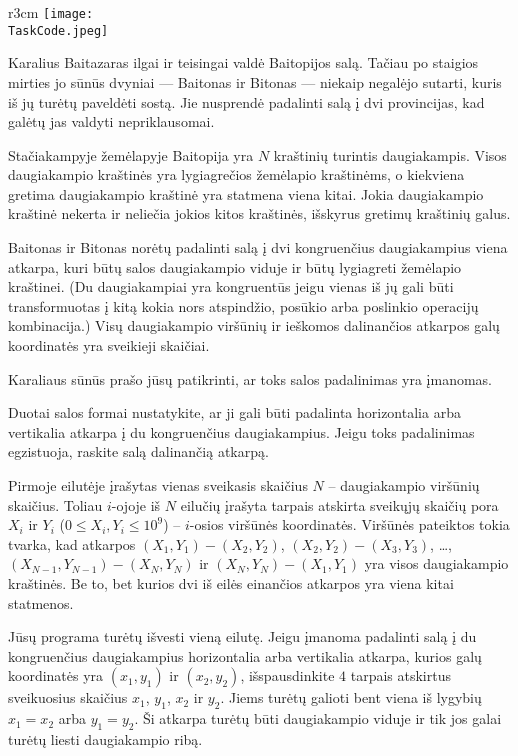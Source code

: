 \documentclass{boi2014-lt}
\renewcommand{\TaskCode}{demarcation}
\begin{document}
    \begin{wrapfigure}{r}{3cm}
        \vspace{-24pt}
		\texttt{[image: \\TaskCode.jpeg]}
	\end{wrapfigure}

    Karalius Baitazaras ilgai ir teisingai valdė Baitopijos salą. Tačiau po
    staigios mirties jo sūnūs dvyniai --- Baitonas ir Bitonas --- niekaip
    negalėjo sutarti, kuris iš jų turėtų paveldėti sostą. Jie nusprendė
    padalinti salą į dvi provincijas, kad galėtų jas valdyti nepriklausomai.
 
    Stačiakampyje žemėlapyje Baitopija yra $N$ kraštinių turintis daugiakampis.
    Visos daugiakampio kraštinės yra lygiagrečios žemėlapio kraštinėms, o
    kiekviena gretima daugiakampio kraštinė yra statmena viena kitai. Jokia
    daugiakampio kraštinė nekerta ir neliečia jokios kitos kraštinės, išskyrus
    gretimų kraštinių galus.

    Baitonas ir Bitonas norėtų padalinti salą į dvi kongruenčius daugiakampius
    viena atkarpa, kuri būtų salos daugiakampio viduje ir būtų lygiagreti
    žemėlapio kraštinei. (Du daugiakampiai yra kongruentūs jeigu vienas iš jų
    gali būti transformuotas į kitą kokia nors atspindžio, posūkio arba poslinkio
    operacijų kombinacija.) Visų daugiakampio viršūnių ir ieškomos dalinančios
    atkarpos galų koordinatės yra sveikieji skaičiai.
 
    Karaliaus sūnūs prašo jūsų patikrinti, ar toks salos padalinimas yra
    įmanomas.

    \Task
    Duotai salos formai nustatykite, ar ji gali būti padalinta horizontalia arba
    vertikalia atkarpa į du kongruenčius daugiakampius. Jeigu toks padalinimas
    egzistuoja, raskite salą dalinančią atkarpą.

    \Input
    Pirmoje eilutėje įrašytas vienas sveikasis skaičius $N$ -- daugiakampio
    viršūnių skaičius. Toliau $i$-ojoje iš $N$ eilučių įrašyta tarpais atskirta
    sveikųjų skaičių pora $X_i$ ir $Y_i$ ($0 \le X_i, Y_i \le 10^9$) -- $i$-osios viršūnės koordinatės.
    Viršūnės pateiktos tokia tvarka, kad atkarpos $(X_1,Y_1) - (X_2,Y_2)$,
    $(X_2,Y_2) - (X_3,Y_3)$, \ldots, $(X_{N-1},Y_{N-1}) - (X_N,Y_N)$ ir
    $(X_N,Y_N) - (X_1,Y_1)$ yra visos daugiakampio kraštinės. Be to, bet kurios
    dvi iš eilės einančios atkarpos yra viena kitai statmenos.

    \Output
    Jūsų programa turėtų išvesti vieną eilutę. Jeigu įmanoma padalinti salą į du
    kongruenčius daugiakampius horizontalia arba vertikalia atkarpa, kurios galų
    koordinatės yra $(x_1, y_1)$ ir $(x_2, y_2)$, išspausdinkite $4$ tarpais
    atskirtus sveikuosius skaičius $x_1$, $y_1$, $x_2$ ir $y_2$. Jiems turėtų
    galioti bent viena iš lygybių $x_1 = x_2$ arba $y_1 = y_2$. Ši atkarpa
    turėtų būti daugiakampio viduje ir tik jos galai turėtų liesti daugiakampio
    ribą.
\end{document}
